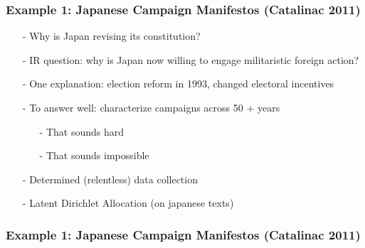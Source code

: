 \documentclass{beamer}
\numberwithin{equation}{section}
\begin{document}
\begin{frame}
\frametitle{Example 1: Japanese Campaign Manifestos (Catalinac 2011)} 


\begin{itemize}
\item[-] Why is Japan revising its constitution?
\item[-] \alert{IR} question: why is Japan now willing to engage militaristic foreign action?
\item[-] \alert{One explanation}: election reform in 1993, changed electoral incentives
\item[-] To answer well: characterize campaigns across 50 + years
\begin{itemize}
\item[-] \alert{That sounds hard} 
\item[-] \alert{That sounds impossible}
\end{itemize}
\item[-] Determined (relentless) data collection
\item[-] Latent Dirichlet Allocation (on japanese texts)
\end{itemize}


\end{frame}



\begin{frame}
\frametitle{Example 1: Japanese Campaign Manifestos (Catalinac 2011) } 




\pause 


\end{frame}
\end{document}
